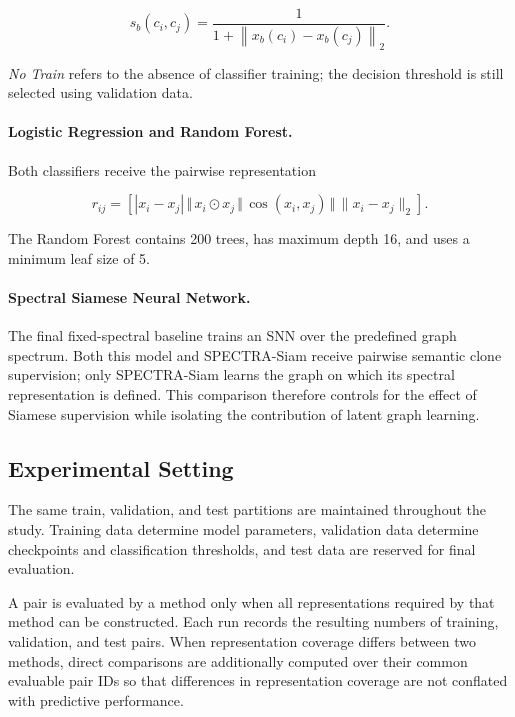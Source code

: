 \documentclass[authoryear,final,5p,times,twocolumn]{elsarticle}
\theoremstyle{plain}
\begin{document}
\begin{equation}
\label{eq:no_train_spectral_similarity}
s_b(c_i,c_j)
=
\frac{
    1
}{
    1+
    \left\|
        x_b(c_i)-x_b(c_j)
    \right\|_2
}.
\end{equation}

\emph{No Train} refers to the absence of classifier training; the decision
threshold is still selected using validation data.

\paragraph{Logistic Regression and Random Forest.}
Both classifiers receive the pairwise representation

\begin{equation}
\label{eq:spectral_pair_features}
r_{ij}
=
\left[
    |x_i-x_j|
    \,\Vert\,
    x_i\odot x_j
    \,\Vert\,
    \cos(x_i,x_j)
    \,\Vert\,
    \|x_i-x_j\|_2
\right].
\end{equation}

The Random Forest contains 200 trees, has maximum depth 16, and uses a minimum
leaf size of 5.

\paragraph{Spectral Siamese Neural Network.}
The final fixed-spectral baseline trains an SNN over the predefined graph
spectrum. Both this model and SPECTRA-Siam receive pairwise semantic clone
supervision; only SPECTRA-Siam learns the graph on which its spectral
representation is defined. This comparison therefore controls for the effect
of Siamese supervision while isolating the contribution of latent graph
learning.


\subsection{Experimental Setting}
\label{sec:exp_settings}

The same train, validation, and test partitions are maintained throughout the
study. Training data determine model parameters, validation data determine
checkpoints and classification thresholds, and test data are reserved for
final evaluation.

A pair is evaluated by a method only when all representations required by
that method can be constructed. Each run records the resulting numbers of
training, validation, and test pairs. When representation coverage differs
between two methods, direct comparisons are additionally computed over their
common evaluable pair IDs so that differences in representation coverage are
not conflated with predictive performance.
\end{document}
